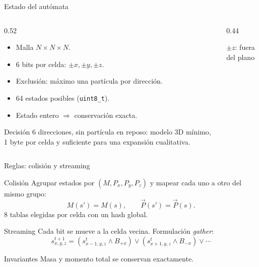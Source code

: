 \documentclass[aspectratio=169]{beamer}
\begin{document}
\begin{frame}{Estado del autómata}
  \begin{columns}[T]
    \begin{column}{0.52\textwidth}
      \begin{itemize}
        \item Malla $N\times N\times N$.
        \item 6 bits por celda: $\pm x,\pm y,\pm z$.
        \item Exclusión: máximo una partícula por dirección.
        \item 64 estados posibles (\texttt{uint8\_t}).
        \item Estado entero $\Rightarrow$ conservación exacta.
      \end{itemize}
      \begin{block}{Decisión}
        \footnotesize
        6 direcciones, \alert{sin partícula en reposo}: modelo 3D mínimo,
        1 byte por celda y suficiente para una expansión cualitativa.
      \end{block}
    \end{column}
    \begin{column}{0.44\textwidth}
      \centering
      \vspace{2mm}
      {\scriptsize $\pm z$: fuera del plano}
    \end{column}
  \end{columns}
\end{frame}

\begin{frame}{Reglas: colisión y streaming}
  \begin{block}{Colisión}
    \footnotesize
    Agrupar estados por $(M,P_x,P_y,P_z)$ y mapear cada uno a otro del mismo
    grupo:
    \[
      M(s')=M(s),\qquad \vec{P}(s')=\vec{P}(s).
    \]
    8 tablas elegidas por celda con un hash global.
  \end{block}
  \begin{block}{Streaming}
    \footnotesize
    Cada bit se mueve a la celda vecina. Formulación \emph{gather}:
    \[
      s^{t+1}_{x,y,z}=(s^t_{x-1,y,z}\wedge B_{+x})
      \vee(s^t_{x+1,y,z}\wedge B_{-x})\vee\cdots
    \]
  \end{block}
  \begin{alertblock}{Invariantes}
    \footnotesize
    Masa y momento total se conservan \alert{exactamente}.
  \end{alertblock}
\end{frame}
\end{document}
